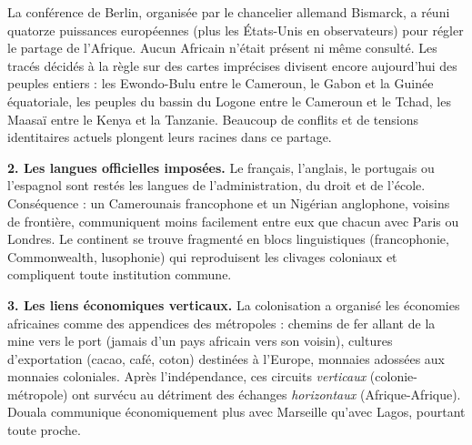 \documentclass[11pt]{article}
\newcommand{\cle}[1]{{\popxbold\color{popdark}#1}}
\begin{document}
\begin{savaistu}
La conférence de Berlin, organisée par le chancelier allemand Bismarck, a réuni quatorze puissances européennes (plus les États-Unis en observateurs) pour régler le partage de l'Afrique. \cle{Aucun Africain} n'était présent ni même consulté. Les tracés décidés à la règle sur des cartes imprécises divisent encore aujourd'hui des peuples entiers : les Ewondo-Bulu entre le Cameroun, le Gabon et la Guinée équatoriale, les peuples du bassin du Logone entre le Cameroun et le Tchad, les Maasaï entre le Kenya et la Tanzanie. Beaucoup de conflits et de tensions identitaires actuels plongent leurs racines dans ce partage.
\end{savaistu}

\textbf{2. Les langues officielles imposées.} Le français, l'anglais, le portugais ou l'espagnol sont restés les langues de l'administration, du droit et de l'école. Conséquence : un Camerounais francophone et un Nigérian anglophone, voisins de frontière, communiquent moins facilement entre eux que chacun avec Paris ou Londres. Le continent se trouve fragmenté en blocs linguistiques (francophonie, Commonwealth, lusophonie) qui reproduisent les clivages coloniaux et compliquent toute institution commune.

\textbf{3. Les liens économiques verticaux.} La colonisation a organisé les économies africaines comme des appendices des métropoles : chemins de fer allant de la mine vers le port (jamais d'un pays africain vers son voisin), cultures d'exportation (cacao, café, coton) destinées à l'Europe, monnaies adossées aux monnaies coloniales. Après l'indépendance, ces circuits \emph{verticaux} (colonie-métropole) ont survécu au détriment des échanges \emph{horizontaux} (Afrique-Afrique). Douala communique économiquement plus avec Marseille qu'avec Lagos, pourtant toute proche.
\end{document}
